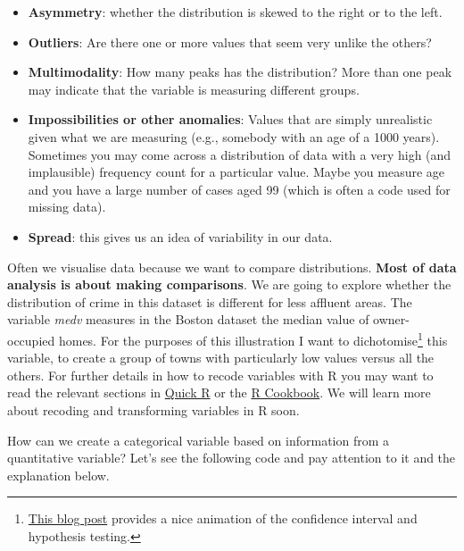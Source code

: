 \documentclass[]{book}
\newenvironment{Shaded}{\begin{snugshade}}{\end{snugshade}}
\newcommand{\FloatTok}[1]{\textcolor[rgb]{0.00,0.00,0.81}{#1}}
\newcommand{\NormalTok}[1]{#1}
\newcommand{\OperatorTok}[1]{\textcolor[rgb]{0.81,0.36,0.00}{\textbf{#1}}}
\newcommand{\StringTok}[1]{\textcolor[rgb]{0.31,0.60,0.02}{#1}}
\providecommand{\tightlist}{%
  \setlength{\itemsep}{0pt}\setlength{\parskip}{0pt}}
\let\rmarkdownfootnote\footnote%
\def\footnote{\protect\rmarkdownfootnote}
\theoremstyle{definition}
\theoremstyle{definition}
\theoremstyle{definition}
\theoremstyle{remark}
\begin{document}
\begin{itemize}
\tightlist
\item
  \textbf{Asymmetry}: whether the distribution is skewed to the right or
  to the left.
\item
  \textbf{Outliers}: Are there one or more values that seem very unlike
  the others?
\item
  \textbf{Multimodality}: How many peaks has the distribution? More than
  one peak may indicate that the variable is measuring different groups.
\item
  \textbf{Impossibilities or other anomalies}: Values that are simply
  unrealistic given what we are measuring (e.g., somebody with an age of
  a 1000 years). Sometimes you may come across a distribution of data
  with a very high (and implausible) frequency count for a particular
  value. Maybe you measure age and you have a large number of cases aged
  99 (which is often a code used for missing data).
\item
  \textbf{Spread}: this gives us an idea of variability in our data.
\end{itemize}

Often we visualise data because we want to compare distributions.
\textbf{Most of data analysis is about making comparisons}. We are going
to explore whether the distribution of crime in this dataset is
different for less affluent areas. The variable \emph{medv} measures in
the Boston dataset the median value of owner-occupied homes. For the
purposes of this illustration I want to dichotomise\footnote{\href{http://www.sumsar.net/blog/2013/12/an-animation-of-the-construction-of-a-confidence-interval/}{This
  blog post} provides a nice animation of the confidence interval and
  hypothesis testing.} this variable, to create a group of towns with
particularly low values versus all the others. For further details in
how to recode variables with R you may want to read the relevant
sections in
\href{http://www.statmethods.net/management/variables.html}{Quick R} or
the \href{http://www.cookbook-r.com/Manipulating_data/Recoding_data/}{R
Cookbook}. We will learn more about recoding and transforming variables
in R soon.

How can we create a categorical variable based on information from a
quantitative variable? Let's see the following code and pay attention to
it and the explanation below.

\begin{Shaded}
\end{Shaded}
\end{document}
